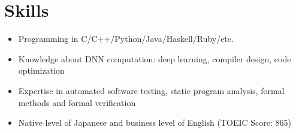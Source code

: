 \documentclass[a4paper,8pt]{report}
\begin{document}
\section*{Skills}
\begin{itemize}
    \item Programming in C/C++/Python/Java/Haskell/Ruby/etc.
    \item Knowledge about DNN computation: deep learning, compiler design, code optimization
    \item Expertise in automated software testing, static program analysis, formal methods and formal verification
    \item Native level of Japanese and business level of English (TOEIC Score: 865)
\end{itemize}
\end{document}

